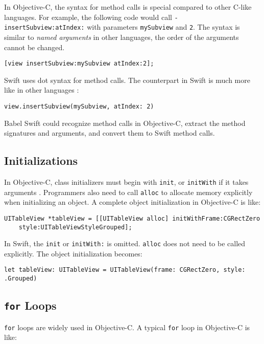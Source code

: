 \documentclass{sfuthesis}
\begin{document}
In Objective-C, the syntax for method calls is special compared to other C-like languages. For example, the following code would call \texttt{- insertSubview:atIndex:} with parameters \texttt{mySubview} and \texttt{2}. The syntax is similar to \emph{named arguments} in other languages, the order of the arguments cannot be changed.

\begin{verbatim}
[view insertSubview:mySubview atIndex:2];
\end{verbatim}

Swift uses dot syntax for method calls. The counterpart in Swift is much more like in other languages \cite{swiftobjcapis}:

\begin{verbatim}
view.insertSubview(mySubview, atIndex: 2)
\end{verbatim}

Babel Swift could recognize method calls in Objective-C, extract the method signatures and arguments, and convert them to Swift method calls.

\subsection{Initializations}

In Objective-C, class initializers must begin with \texttt{init}, or \texttt{initWith} if it takes arguments \cite{objcinit}. Programmers also need to call \texttt{alloc} to allocate memory explicitly when initializing an object. A complete object initialization in Objective-C is like:

\begin{verbatim}
UITableView *tableView = [[UITableView alloc] initWithFrame:CGRectZero
    style:UITableViewStyleGrouped];
\end{verbatim}

In Swift, the \texttt{init} or \texttt{initWith:} is omitted. \texttt{alloc} does not need to be called explicitly. The object initialization becomes:

\begin{verbatim}
let tableView: UITableView = UITableView(frame: CGRectZero, style: .Grouped)
\end{verbatim}

\subsection{\texttt{for} Loops}

\texttt{for} loops are widely used in Objective-C. A typical \texttt{for} loop in Objective-C is like:
\end{document}
